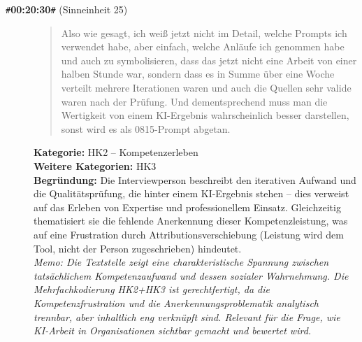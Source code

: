\begin{description}
  \item[\texttt{\#}\textbf{00:20:30}\texttt{\#} (Sinneinheit 25)]
  \begin{quote}
  Also wie gesagt, ich weiß jetzt nicht im Detail, welche Prompts ich verwendet habe, aber einfach, welche Anläufe ich genommen habe und auch zu symbolisieren, dass das jetzt nicht eine Arbeit von einer halben Stunde war, sondern dass es in Summe über eine Woche verteilt mehrere Iterationen waren und auch die Quellen sehr valide waren nach der Prüfung. Und dementsprechend muss man die Wertigkeit von einem KI-Ergebnis wahrscheinlich besser darstellen, sonst wird es als 0815-Prompt abgetan.
  \end{quote}
  \textbf{Kategorie:} HK2 -- Kompetenzerleben\\
  \textbf{Weitere Kategorien:} HK3\\
  \textbf{Begr\"undung:} Die Interviewperson beschreibt den iterativen Aufwand und die Qualitätsprüfung, die hinter einem KI-Ergebnis stehen – dies verweist auf das Erleben von Expertise und professionellem Einsatz. Gleichzeitig thematisiert sie die fehlende Anerkennung dieser Kompetenzleistung, was auf eine Frustration durch Attributionsverschiebung (Leistung wird dem Tool, nicht der Person zugeschrieben) hindeutet.
  \\\textit{Memo: Die Textstelle zeigt eine charakteristische Spannung zwischen tatsächlichem Kompetenzaufwand und dessen sozialer Wahrnehmung. Die Mehrfachkodierung HK2+HK3 ist gerechtfertigt, da die Kompetenzfrustration und die Anerkennungsproblematik analytisch trennbar, aber inhaltlich eng verknüpft sind. Relevant für die Frage, wie KI-Arbeit in Organisationen sichtbar gemacht und bewertet wird.}
\end{description}
\medskip

